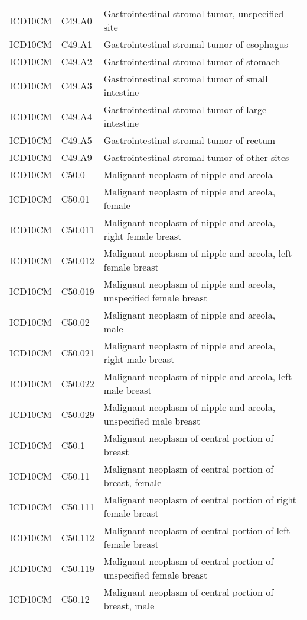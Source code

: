 \begin{longtable}{p{}p{}p{}}
  ICD10CM & C49.A0 & Gastrointestinal stromal tumor, unspecified site \\ 
  ICD10CM & C49.A1 & Gastrointestinal stromal tumor of esophagus \\ 
  ICD10CM & C49.A2 & Gastrointestinal stromal tumor of stomach \\ 
  ICD10CM & C49.A3 & Gastrointestinal stromal tumor of small intestine \\ 
  ICD10CM & C49.A4 & Gastrointestinal stromal tumor of large intestine \\ 
  ICD10CM & C49.A5 & Gastrointestinal stromal tumor of rectum \\ 
  ICD10CM & C49.A9 & Gastrointestinal stromal tumor of other sites \\ 
  ICD10CM & C50.0 & Malignant neoplasm of nipple and areola \\ 
  ICD10CM & C50.01 & Malignant neoplasm of nipple and areola, female \\ 
  ICD10CM & C50.011 & Malignant neoplasm of nipple and areola, right female breast \\ 
  ICD10CM & C50.012 & Malignant neoplasm of nipple and areola, left female breast \\ 
  ICD10CM & C50.019 & Malignant neoplasm of nipple and areola, unspecified female breast \\ 
  ICD10CM & C50.02 & Malignant neoplasm of nipple and areola, male \\ 
  ICD10CM & C50.021 & Malignant neoplasm of nipple and areola, right male breast \\ 
  ICD10CM & C50.022 & Malignant neoplasm of nipple and areola, left male breast \\ 
  ICD10CM & C50.029 & Malignant neoplasm of nipple and areola, unspecified male breast \\ 
  ICD10CM & C50.1 & Malignant neoplasm of central portion of breast \\ 
  ICD10CM & C50.11 & Malignant neoplasm of central portion of breast, female \\ 
  ICD10CM & C50.111 & Malignant neoplasm of central portion of right female breast \\ 
  ICD10CM & C50.112 & Malignant neoplasm of central portion of left female breast \\ 
  ICD10CM & C50.119 & Malignant neoplasm of central portion of unspecified female breast \\ 
  ICD10CM & C50.12 & Malignant neoplasm of central portion of breast, male \\ 

\end{longtable}
